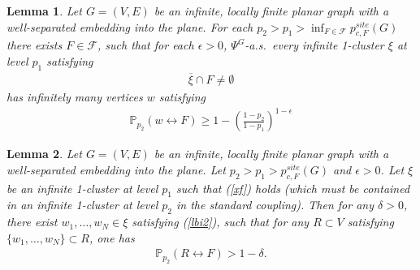 \documentclass[10pt,a4paper]{amsart}
\newtheorem{lemma}{Lemma}
\newcommand\ol{\overline}
\begin{document}
\begin{lemma}\label{l74}Let $G=(V,E)$ be an infinite, locally finite planar graph with a well-separated embedding into the plane. For each $p_2>p_1>\inf_{F\in\mathcal{F}}p_{c,F}^{site}(G)$  there exists $F\in\mathcal{F}$, such that for each $\epsilon>0$, $\Psi^{G}$-a.s.~every infinite 1-cluster $\xi$ at level $p_1$ satisfying
\begin{align}
\ol{\xi}\cap F\neq \emptyset\label{xf}
\end{align}
has infinitely many vertices $w$ satisfying
\begin{align}
\mathbb{P}_{p_2}(w\leftrightarrow F)\geq 1-\left(\frac{1-p_2}{1-p_1}\right)^{1-\epsilon}\label{lbi}
\end{align}
\end{lemma}

\begin{lemma}\label{lem316}Let $G=(V,E)$ be an infinite, locally finite planar graph with a well-separated embedding into the plane. Let $p_2>p_1>p_{c,F}^{site}(G)$ and $\epsilon>0$. Let $\xi$ be an infinite 1-cluster at level $p_1$ such that (\ref{xf}) holds (which must be contained in an infinite 1-cluster at level $p_2$ in the standard coupling). Then for any $\delta>0$, there exist $w_1,\ldots,w_N\in \xi$ satisfying (\ref{lbi2}), such that for any $R\subset V$ satisfying $\{w_1,\ldots,w_N\}\subset R$, one  has
\begin{align*}
\mathbb{P}_{p_2}(R\leftrightarrow F)>1-\delta.
\end{align*}
\end{lemma}
\end{document}
